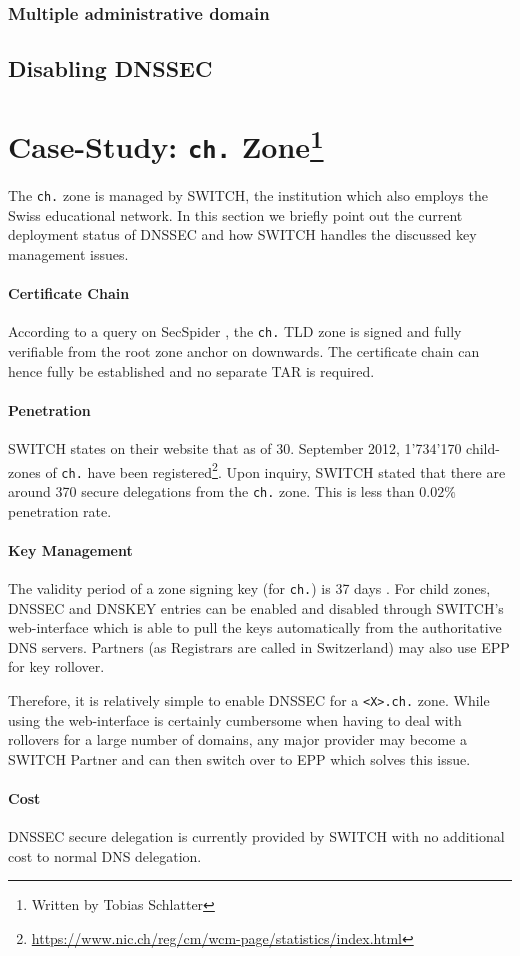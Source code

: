 \documentclass[a4paper,twocolumn]{scrartcl}
\newcommand{\wbts}{\protect\footnote{Written by Tobias Schlatter}}
\begin{document}
\subsubsection{Multiple administrative domain}
\subsection{Disabling DNSSEC}

\section{Case-Study: \texttt{ch.} Zone\wbts}
\label{sec:case-study}

The \verb|ch.| zone is managed by SWITCH, the institution which also
employs the Swiss educational network. In this section we briefly
point out the current deployment status of DNSSEC and how SWITCH
handles the discussed key management issues.

\paragraph{Certificate Chain} According to a query on SecSpider
\cite{secspider}, the \verb|ch.| TLD zone is signed and fully
verifiable from the root zone anchor on downwards. The certificate
chain can hence fully be established and no separate TAR is required.

\paragraph{Penetration} SWITCH states on their website that as of
30. September 2012, 1'734'170 child-zones of \verb|ch.| have been
registered\footnote{\url{https://www.nic.ch/reg/cm/wcm-page/statistics/index.html}}. Upon
inquiry, SWITCH stated that there are around 370 secure delegations
from the \verb|ch.| zone. This is less than $0.02\%$ penetration
rate.

\paragraph{Key Management} The validity period of a zone signing key
(for \verb|ch.|) is 37 days \cite{switch10}. For child zones,  DNSSEC
and DNSKEY entries can be enabled and disabled through SWITCH's 
web-interface which is able to pull the keys automatically from the
authoritative DNS servers. Partners (as Registrars are called in
Switzerland) may also use EPP for key rollover.

Therefore, it is relatively simple to enable DNSSEC for a \verb|<X>.ch.| 
zone. While using the web-interface is certainly cumbersome when
having to deal with rollovers for a large number of domains, any major
provider may become a SWITCH Partner and can then switch over to EPP
which solves this issue.

\paragraph{Cost} DNSSEC secure delegation is currently provided by
SWITCH with no additional cost to normal DNS delegation.

\nocite{*}


\end{document}
